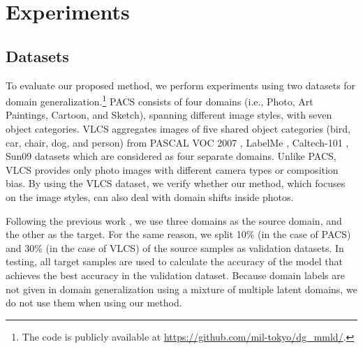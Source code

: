 \documentclass[letterpaper]{article} \usepackage{aaai20}  \usepackage{times}  \usepackage{helvet} \usepackage{courier}  \usepackage[hyphens]{url}  \usepackage{graphicx} \urlstyle{rm} \def\UrlFont{\rm}  \usepackage{graphicx}  \usepackage[whole]{bxcjkjatype}
\begin{document}
\section{Experiments}
\subsection{Datasets}
To evaluate our proposed method, we perform experiments using two datasets for domain generalization.\footnote[1]{The code is publicly available at \url{https://github.com/mil-tokyo/dg_mmld/}.} PACS \cite{PACS} consists of four domains (i.e., Photo, Art Paintings, Cartoon, and Sketch), spanning different image styles, with seven object categories.
VLCS \cite{dataset_bias} aggregates images of five shared object categories (bird, car, chair, dog, and person) from PASCAL VOC 2007 \cite{VOC2007}, LabelMe \cite{labelme}, Caltech-101 \cite{caltech_101}, Sun09 datasets \cite{sun09} which are considered as four separate domains.
Unlike PACS, VLCS provides only photo images with different camera types or composition bias. By using the VLCS dataset, we verify whether our method, which focuses on the image styles, can also deal with domain shifts inside photos.\par
Following the previous work \cite{JiGen}, we use three domains as the source domain, and the other as the target. For the same reason, we split 10\% (in the case of PACS) and 30\% (in the case of VLCS) of the source samples as validation datasets.
In testing, all target samples are used to calculate the accuracy of the model that achieves the best accuracy in the validation dataset. Because domain labels are not given in domain generalization using a mixture of multiple latent domains, we do not use them when using our method.
\end{document}
